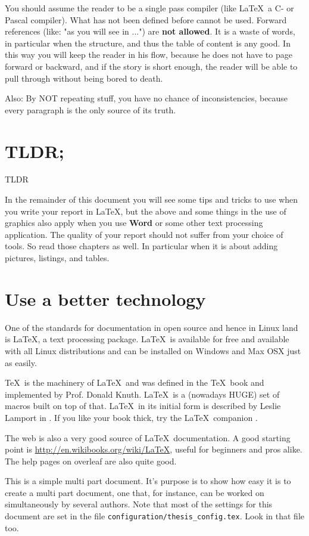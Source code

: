 You should assume the reader to be a single pass compiler (like \LaTeX\ a C- or Pascal compiler). What has not been defined before cannot be used.
Forward references (like: "as you will see in ...") are \textbf{not allowed}. It is a waste of words, in particular when the structure, and thus the table of content is any good.
In this way you will keep the reader in his flow, because he does not have to page forward or backward, and if the story is short enough, the reader will be able to pull through without being bored to death.

Also: By NOT repeating stuff, you have no chance of inconsistencies, because every paragraph is the only source of its truth.

\section{TLDR;}\gls{TLDR}

In the remainder of this document you will see some tips and tricks to use when you write your report in \LaTeX,
but the above and some things in the use of graphics also apply when you use \textbf{Word} or some other text processing application. The quality of your report should not suffer from your choice of tools.
So read those chapters as well. In particular when it is about adding pictures, listings, and tables.

\section{Use a better technology}
One of the standards for documentation in open source and hence in
Linux land is \LaTeX, a text processing package. \LaTeX\ is available
for free and available with all Linux distributions and can be installed on Windows and Max OSX just as easily.

\TeX\ is the machinery of \LaTeX\ and was defined in the \TeX\ book
\cite{texbook} and implemented by
Prof. Donald Knuth. \LaTeX\ is a (nowadays HUGE) set of macros built
on top of that. \LaTeX\ in its initial form is described by Leslie
Lamport in \cite{latexbook}. If you like your book thick, try the
\LaTeX\ companion \cite{latexcompanion}.

The web is also a very good source of \LaTeX\ documentation. A good
starting point is \url{http://en.wikibooks.org/wiki/LaTeX}, useful for
beginners and pros alike. The help pages on overleaf are also quite good.

This is a simple multi part document. It's purpose is to show how easy it is
to create a multi part document, one that, for instance, can be worked on 
simultaneously by several authors. Note that most of the settings for
this document are set in the file \texttt{configuration/thesis\_config.tex}. 
Look in that file too.

